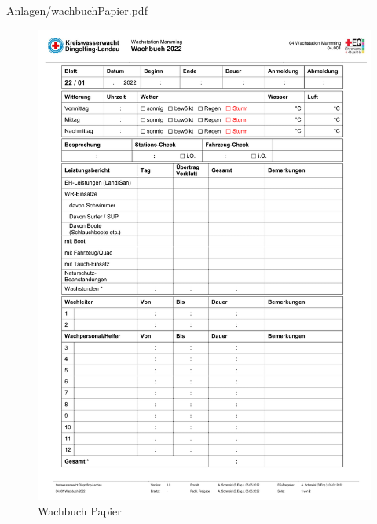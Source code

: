 \documentclass[fontsize=12pt,openright,oneside,paper=a4,BCOR=1cm]{scrbook}
\begin{document}
\begin{appendix}

    {Anlagen/wachbuchPapier.pdf}
\begin{figure}[H]
\centering
    \includegraphics[page=2,scale=0.75]{Anlagen/wachbuchPapier.pdf}
  \caption{Wachbuch Papier}
  \label{fig:wachbuchpapier}
\end{figure}


\end{appendix}

	 




\end{document}
